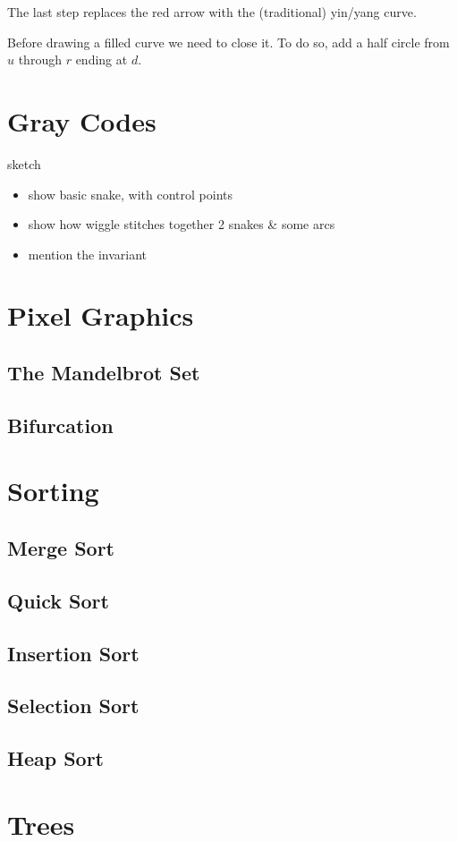 \documentclass{article}
\begin{document}
The last step replaces the red arrow with the (traditional) yin/yang curve.

Before drawing a filled curve we need to close it.
To do so, add a half circle from $u$ through $r$ ending at $d$.

\section{Gray Codes}
sketch
\begin{itemize}
\item show basic snake, with control points
\item show how wiggle stitches together 2 snakes \& some arcs
\item mention the invariant
\end{itemize}

\section{Pixel Graphics}
\subsection{The Mandelbrot Set}
\subsection{Bifurcation}
\section{Sorting}
\subsection{Merge Sort}
\subsection{Quick Sort}
\subsection{Insertion Sort}
\subsection{Selection Sort}
\subsection{Heap Sort}
\section{Trees}
\end{document}

